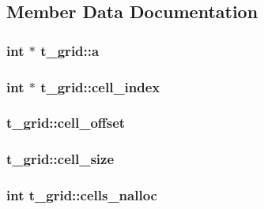 \subsection{\-Member \-Data \-Documentation}
\hypertarget{structt__grid_a1f08eb820bad0c0d005857cd71911e89}{
\subsubsection[{a}]{\setlength{\rightskip}{0pt plus 5cm}int $\ast$ {\bf t\-\_\-grid\-::a}}}\label{structt__grid_a1f08eb820bad0c0d005857cd71911e89}
\hypertarget{structt__grid_af5430fe5061f78cbd27e027de1d150f3}{
\subsubsection[{cell\-\_\-index}]{\setlength{\rightskip}{0pt plus 5cm}int $\ast$ {\bf t\-\_\-grid\-::cell\-\_\-index}}}\label{structt__grid_af5430fe5061f78cbd27e027de1d150f3}
\hypertarget{structt__grid_a37a27900f58a8dea74146aafdc2fc9fb}{
\subsubsection[{cell\-\_\-offset}]{ {\bf t\-\_\-grid\-::cell\-\_\-offset}}}\label{structt__grid_a37a27900f58a8dea74146aafdc2fc9fb}
\hypertarget{structt__grid_a0af230aa84797ac22dac168f73d8d130}{
\subsubsection[{cell\-\_\-size}]{ {\bf t\-\_\-grid\-::cell\-\_\-size}}}\label{structt__grid_a0af230aa84797ac22dac168f73d8d130}
\hypertarget{structt__grid_a524584efb2dde59cfe21001f2b9ab239}{
\subsubsection[{cells\-\_\-nalloc}]{\setlength{\rightskip}{0pt plus 5cm}int {\bf t\-\_\-grid\-::cells\-\_\-nalloc}}}\label{structt__grid_a524584efb2dde59cfe21001f2b9ab239}
